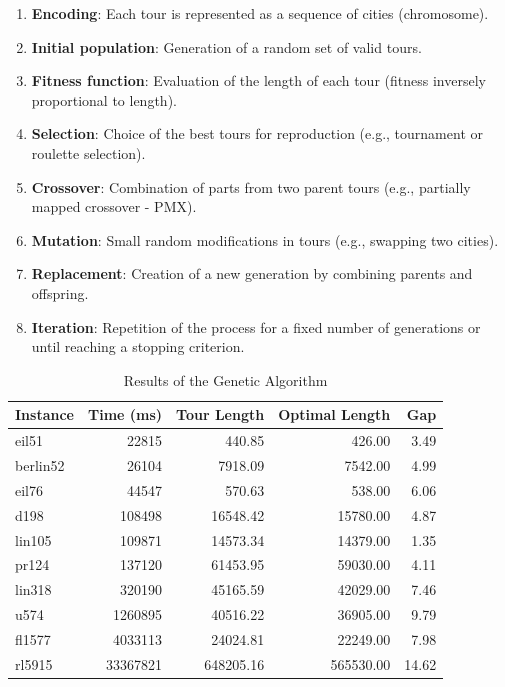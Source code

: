 \begin{enumerate}
	\item \textbf{Encoding}: Each tour is represented as a sequence of cities (chromosome).
	\item \textbf{Initial population}: Generation of a random set of valid tours.
	\item \textbf{Fitness function}: Evaluation of the length of each tour (fitness inversely proportional to length).
	\item \textbf{Selection}: Choice of the best tours for reproduction (e.g., tournament or roulette selection).
	\item \textbf{Crossover}: Combination of parts from two parent tours (e.g., partially mapped crossover - PMX).
	\item \textbf{Mutation}: Small random modifications in tours (e.g., swapping two cities).
	\item \textbf{Replacement}: Creation of a new generation by combining parents and offspring.
	\item \textbf{Iteration}: Repetition of the process for a fixed number of generations or until reaching a stopping criterion.
\end{enumerate}
\begin{table}[H]
	\centering
	\caption{Results of the Genetic Algorithm}
	\begin{tabular}{lrrrr}
		\toprule
		Instance  & Time (ms) & Tour Length & Optimal Length & Gap   \\
		\midrule
		eil51    & 22815      & 440.85         & 426.00           & 3.49  \\
		berlin52 & 26104      & 7918.09        & 7542.00          & 4.99  \\
		eil76    & 44547      & 570.63         & 538.00           & 6.06  \\
		d198     & 108498     & 16548.42       & 15780.00         & 4.87  \\
		lin105   & 109871     & 14573.34       & 14379.00         & 1.35  \\
		pr124    & 137120     & 61453.95       & 59030.00         & 4.11  \\
		lin318   & 320190     & 45165.59       & 42029.00         & 7.46  \\
		u574     & 1260895    & 40516.22       & 36905.00         & 9.79  \\
		fl1577   & 4033113    & 24024.81       & 22249.00         & 7.98  \\
		rl5915   & 33367821   & 648205.16      & 565530.00        & 14.62 \\
		\bottomrule
	\end{tabular}
\end{table}

